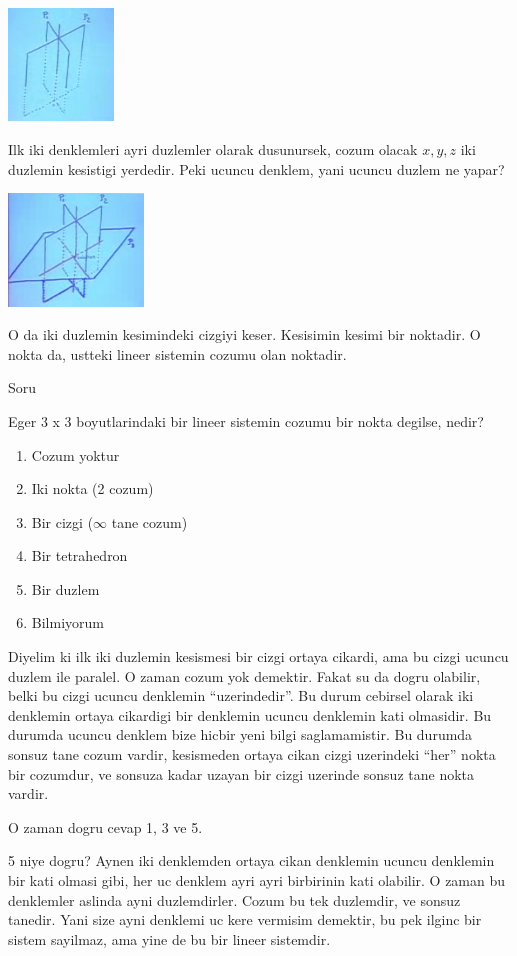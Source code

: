 \documentclass[12pt,fleqn]{article}
\begin{document}
\includegraphics[height=3cm]{4_3.png}

Ilk iki denklemleri ayri duzlemler olarak dusunursek, cozum olacak $x,y,z$
iki duzlemin kesistigi yerdedir. Peki ucuncu denklem, yani ucuncu duzlem ne
yapar? 

\includegraphics[height=3cm]{4_4.png}

O da iki duzlemin kesimindeki cizgiyi keser. Kesisimin kesimi bir
noktadir. O nokta da, ustteki lineer sistemin cozumu olan noktadir. 

Soru 

Eger 3 x 3 boyutlarindaki bir lineer sistemin cozumu bir nokta degilse,
nedir? 

\begin{enumerate} 
\item Cozum yoktur
\item Iki nokta (2 cozum)
\item Bir cizgi ($\infty$ tane cozum)
\item Bir tetrahedron
\item Bir duzlem
\item Bilmiyorum
\end{enumerate}

Diyelim ki ilk iki duzlemin kesismesi bir cizgi ortaya cikardi, ama bu
cizgi ucuncu duzlem ile paralel. O zaman cozum yok demektir. Fakat su da
dogru olabilir, belki bu cizgi ucuncu denklemin ``uzerindedir''. Bu durum
cebirsel olarak iki denklemin ortaya cikardigi bir denklemin ucuncu
denklemin kati olmasidir. Bu durumda ucuncu denklem bize hicbir yeni bilgi
saglamamistir. Bu durumda sonsuz tane cozum vardir, kesismeden ortaya
cikan cizgi uzerindeki ``her'' nokta bir cozumdur, ve sonsuza kadar uzayan
bir cizgi uzerinde sonsuz tane nokta vardir. 

O zaman dogru cevap 1, 3 ve 5.

5 niye dogru? Aynen iki denklemden ortaya cikan denklemin ucuncu denklemin
bir kati olmasi gibi, her uc denklem ayri ayri birbirinin kati olabilir. O
zaman bu denklemler aslinda ayni duzlemdirler. Cozum bu tek duzlemdir, ve
sonsuz tanedir. Yani size ayni denklemi uc kere vermisim demektir, bu pek
ilginc bir sistem sayilmaz, ama yine de bu bir lineer sistemdir. 
\end{document}
